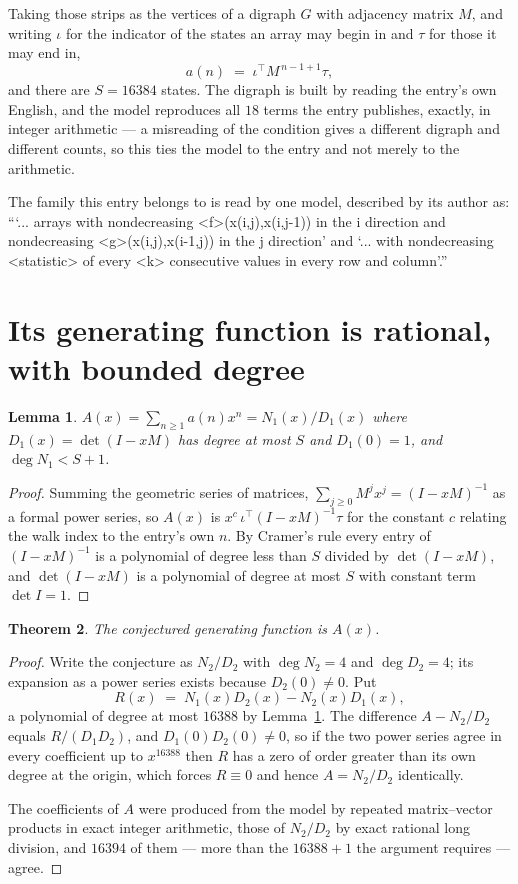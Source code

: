 \documentclass[11pt,a4paper]{article}
\theoremstyle{plain}
\newtheorem{theorem}{Theorem}
\newtheorem{lemma}[theorem]{Lemma}
\theoremstyle{definition}
\begin{document}
Taking those strips as the vertices of a digraph $G$ with adjacency matrix $M$, and writing
$\iota$ for the indicator of the states an array may begin in and $\tau$ for those it may end
in,
\[
a(n)\;=\;\iota^{\!\top}M^{\,n-1+1}\tau ,
\]
and there are $S=16384$ states. The digraph is built by reading the entry's own English, and the
model reproduces all $18$ terms the entry publishes, exactly, in integer arithmetic --- a
misreading of the condition gives a different digraph and different counts, so this ties the
model to the entry and not merely to the arithmetic.

The family this entry belongs to is read by one model, described by its author as: ```... arrays with nondecreasing <f>(x(i,j),x(i,j-1)) in the i direction and nondecreasing <g>(x(i,j),x(i-1,j)) in the j direction' and `... with nondecreasing <statistic> of every <k> consecutive values in every row and column'.''


\section{Its generating function is rational, with bounded degree}

\begin{lemma}\label{lem:rat}
$A(x)=\sum_{n\ge1}a(n)x^n=N_1(x)/D_1(x)$ where $D_1(x)=\det(I-xM)$ has degree at most
$S$ and $D_1(0)=1$, and $\deg N_1<S+1$.
\end{lemma}

\begin{proof}
Summing the geometric series of matrices, $\sum_{j\ge0}M^jx^j=(I-xM)^{-1}$ as a formal
power series, so $A(x)$ is $x^{c}\,\iota^{\!\top}(I-xM)^{-1}\tau$ for the constant $c$
relating the walk index to the entry's own $n$. By Cramer's rule every entry of
$(I-xM)^{-1}$ is a polynomial of degree less than $S$ divided by $\det(I-xM)$, and
$\det(I-xM)$ is a polynomial of degree at most $S$ with constant term $\det I=1$.
\end{proof}

\begin{theorem}
The conjectured generating function is $A(x)$.
\end{theorem}

\begin{proof}
Write the conjecture as $N_2/D_2$ with $\deg N_2=4$ and $\deg D_2=4$; its expansion as a
power series exists because $D_2(0)\neq0$. Put
\[
R(x)\;=\;N_1(x)D_2(x)-N_2(x)D_1(x),
\]
a polynomial of degree at most $16388$ by Lemma~\ref{lem:rat}. The difference
$A-N_2/D_2$ equals $R/(D_1D_2)$, and $D_1(0)D_2(0)\neq0$, so if the two power series agree in
every coefficient up to $x^{16388}$ then $R$ has a zero of order greater than its own
degree at the origin, which forces $R\equiv0$ and hence $A=N_2/D_2$ identically.

The coefficients of $A$ were produced from the model by repeated matrix--vector products in
exact integer arithmetic, those of $N_2/D_2$ by exact rational long division, and $16394$
of them --- more than the $16388+1$ the argument requires --- agree.
\end{proof}
\end{document}
